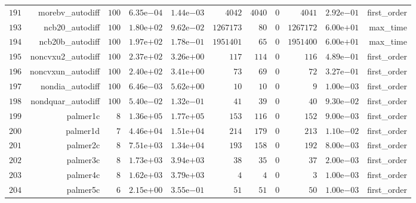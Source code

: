 \documentclass[varwidth=20cm,crop=true]{standalone}
\begin{document}
\begin{longtable}{rrrrrrrrrrr}
  \(   191\) & morebv\_autodiff & \(   100\) & \( 6.35\)e\(-04\) & \( 1.44\)e\(-03\) & \(  4042\) & \(  4040\) & \(     0\) & \(  4041\) & \( 2.92\)e\(-01\) & first\_order \\
  \(   193\) & ncb20\_autodiff & \(   100\) & \( 1.80\)e\(+02\) & \( 9.62\)e\(-02\) & \(1267173\) & \(    80\) & \(     0\) & \(1267172\) & \( 6.00\)e\(+01\) & max\_time \\
  \(   194\) & ncb20b\_autodiff & \(   100\) & \( 1.97\)e\(+02\) & \( 1.78\)e\(-01\) & \(1951401\) & \(    65\) & \(     0\) & \(1951400\) & \( 6.00\)e\(+01\) & max\_time \\
  \(   195\) & noncvxu2\_autodiff & \(   100\) & \( 2.37\)e\(+02\) & \( 3.26\)e\(+00\) & \(   117\) & \(   114\) & \(     0\) & \(   116\) & \( 4.89\)e\(-01\) & first\_order \\
  \(   196\) & noncvxun\_autodiff & \(   100\) & \( 2.40\)e\(+02\) & \( 3.41\)e\(+00\) & \(    73\) & \(    69\) & \(     0\) & \(    72\) & \( 3.27\)e\(-01\) & first\_order \\
  \(   197\) & nondia\_autodiff & \(   100\) & \( 6.46\)e\(-03\) & \( 5.62\)e\(+00\) & \(    10\) & \(    10\) & \(     0\) & \(     9\) & \( 1.00\)e\(-03\) & first\_order \\
  \(   198\) & nondquar\_autodiff & \(   100\) & \( 5.40\)e\(-02\) & \( 1.32\)e\(-01\) & \(    41\) & \(    39\) & \(     0\) & \(    40\) & \( 9.30\)e\(-02\) & first\_order \\
  \(   199\) & palmer1c & \(     8\) & \( 1.36\)e\(+05\) & \( 1.77\)e\(+05\) & \(   153\) & \(   116\) & \(     0\) & \(   152\) & \( 9.00\)e\(-03\) & first\_order \\
  \(   200\) & palmer1d & \(     7\) & \( 4.46\)e\(+04\) & \( 1.51\)e\(+04\) & \(   214\) & \(   179\) & \(     0\) & \(   213\) & \( 1.10\)e\(-02\) & first\_order \\
  \(   201\) & palmer2c & \(     8\) & \( 7.51\)e\(+03\) & \( 1.34\)e\(+04\) & \(   193\) & \(   158\) & \(     0\) & \(   192\) & \( 8.00\)e\(-03\) & first\_order \\
  \(   202\) & palmer3c & \(     8\) & \( 1.73\)e\(+03\) & \( 3.94\)e\(+03\) & \(    38\) & \(    35\) & \(     0\) & \(    37\) & \( 2.00\)e\(-03\) & first\_order \\
  \(   203\) & palmer4c & \(     8\) & \( 1.62\)e\(+03\) & \( 3.79\)e\(+03\) & \(     4\) & \(     4\) & \(     0\) & \(     3\) & \( 1.00\)e\(-03\) & first\_order \\
  \(   204\) & palmer5c & \(     6\) & \( 2.15\)e\(+00\) & \( 3.55\)e\(-01\) & \(    51\) & \(    51\) & \(     0\) & \(    50\) & \( 1.00\)e\(-03\) & first\_order \\

\end{longtable}
\end{document}
